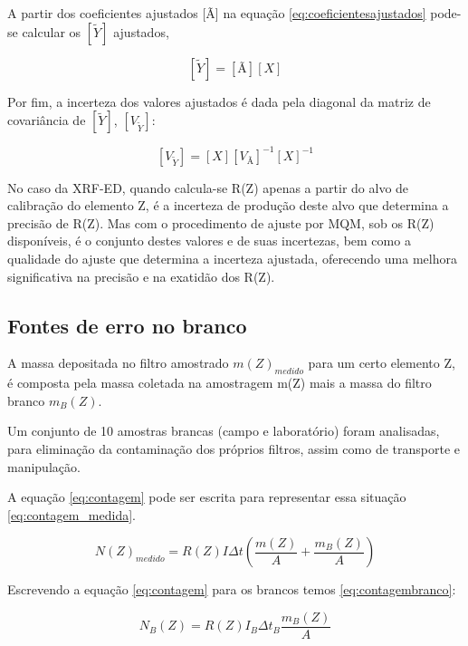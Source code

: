 A partir dos coeficientes ajustados [Ã] na equação \ref{eq:coeficientesajustados} 
pode-se calcular os $[\tilde{Y}]$ ajustados,

\begin{equation}
  \label{eq:polinomioajustado}
  [\tilde{Y}] = [Ã][X]
\end{equation}

Por fim, a incerteza dos valores ajustados é dada pela diagonal da matriz de 
covariância de $[\tilde{Y}]$, $[V_{\tilde{Y}}]$:

\begin{equation}
  \label{eq:matrizcovarianciaY}
  [V_{\tilde{Y}}] = [X] [V_{Ã}]^{-1} [X]^{-1}
\end{equation}

No caso da XRF-ED, quando calcula-se R(Z) apenas a partir do alvo de 
calibração do elemento Z, é a incerteza de produção deste alvo que determina 
a precisão de R(Z). Mas com o procedimento de ajuste por MQM, sob os 
R(Z) disponíveis, é o conjunto destes valores e de suas incertezas, bem como a 
qualidade do ajuste que determina a incerteza ajustada, oferecendo uma 
melhora significativa na precisão e na exatidão dos R(Z).

\subsection{Fontes de erro no branco}

A massa depositada no filtro amostrado $m(Z)_{medido}$ para um certo elemento Z,
é composta pela massa coletada na amostragem m(Z) mais a massa do filtro 
branco $m_{B}(Z)$.

Um conjunto de 10 amostras brancas (campo e laboratório) foram analisadas, 
para eliminação da contaminação dos próprios filtros, assim como de 
transporte e manipulação.

A equação \ref{eq:contagem} pode ser escrita para representar essa situação
\ref{eq:contagem_medida}. 

\begin{equation}
  \label{eq:contagem_medida}
  N(Z)_{medido} = R(Z) I\Delta t \left( \frac{m(Z)}{A} + \frac{m_B(Z)}{A} \right)
\end{equation}  

Escrevendo a equação \ref{eq:contagem} para os brancos temos \ref{eq:contagembranco}:

\begin{equation}
  \label{eq:contagembranco}
  N_B(Z) = R(Z) I_B\Delta t_B \frac{m_B(Z)}{A}
\end{equation}

